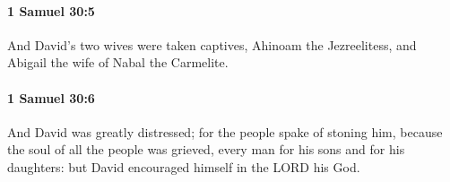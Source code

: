 		\paragraph{1 Samuel 30:5} %
			\label{1SAMUEL-30-5}

			And David’s two wives were taken captives, Ahinoam the Jezreelitess, and Abigail the wife of Nabal the Carmelite.


		\paragraph{1 Samuel 30:6} %
			\label{1SAMUEL-30-6}

			And David was greatly distressed; for the people spake of stoning him, because the soul of all the people was grieved, every man for his sons and for his daughters: but David encouraged himself in the LORD his God.


